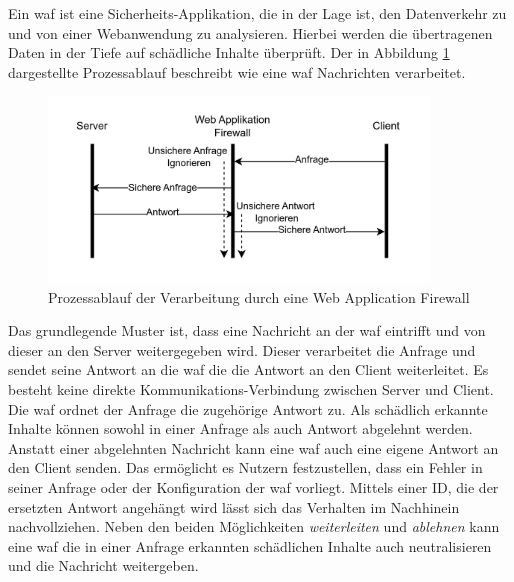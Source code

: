 \label{sec:waf-theory}
Ein \ac{waf} ist eine Sicherheits-Applikation, die in der Lage ist, den Datenverkehr zu und von einer Webanwendung zu analysieren.
Hierbei werden die übertragenen Daten in der Tiefe auf schädliche Inhalte überprüft.
Der in Abbildung \ref{fig:waf-porcess-flow} dargestellte Prozessablauf beschreibt wie eine \ac{waf} Nachrichten verarbeitet.

\begin{figure}[!hbt]
    \centering
    \includegraphics[width=0.9\textwidth]{./images/Waf-Process-fliow.png}
    \caption{Prozessablauf der Verarbeitung durch eine Web Application Firewall}
    \label{fig:waf-porcess-flow}
\end{figure}

Das grundlegende Muster ist, dass eine Nachricht an der \ac{waf} eintrifft und von dieser an den Server weitergegeben wird.
Dieser verarbeitet die Anfrage und sendet seine Antwort an die \ac{waf} die die Antwort an den Client weiterleitet.
Es besteht keine direkte Kommunikations-Verbindung zwischen Server und Client.
Die \ac{waf} ordnet der Anfrage die zugehörige Antwort zu.
Als schädlich erkannte Inhalte können sowohl in einer Anfrage als auch Antwort abgelehnt werden.
Anstatt einer abgelehnten Nachricht kann eine \ac{waf} auch eine eigene Antwort an den Client senden.
Das ermöglicht es Nutzern festzustellen, dass ein Fehler in seiner Anfrage oder der Konfiguration der \ac{waf} vorliegt.
Mittels einer ID, die der ersetzten Antwort angehängt wird lässt sich das Verhalten im Nachhinein nachvollziehen.
Neben den beiden Möglichkeiten \textit{weiterleiten} und \textit{ablehnen} kann eine \ac{waf} die in einer Anfrage erkannten schädlichen Inhalte auch neutralisieren und die Nachricht weitergeben\cite{schmitzGrundlagenWebApplication2018}.\\

